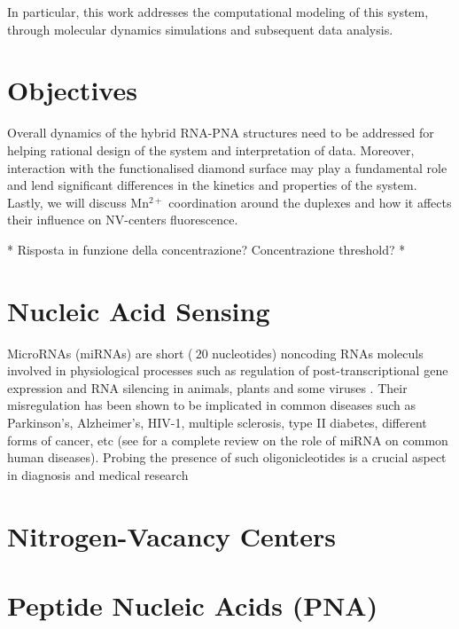 In particular, this work addresses the computational modeling of this system, through molecular dynamics simulations and subsequent data analysis.

\section{Objectives}

Overall dynamics of the hybrid RNA-PNA structures need to be addressed for helping rational design of the system and interpretation of data.
Moreover, interaction with the functionalised diamond surface may play a fundamental role and lend significant differences in the kinetics and properties of the system. Lastly, we will discuss Mn$^{2+}$ coordination around the duplexes and how it affects their influence on NV-centers fluorescence.

*
Risposta in funzione della concentrazione?
Concentrazione threshold?
*

\section{Nucleic Acid Sensing}

MicroRNAs (miRNAs) are short ($~ 20$ nucleotides) noncoding RNAs moleculs involved in physiological processes such as regulation of post-transcriptional gene expression and RNA silencing in animals, plants and some viruses \parencite{bartel_micrornas_2009}.
Their misregulation has been shown to be implicated in common diseases such as Parkinson's, Alzheimer's, HIV-1, multiple sclerosis, type II diabetes, different forms of cancer, etc (see \parencite{li_micrornas_2012} for a complete review on the role of miRNA on common human diseases).
Probing the presence of such oligonicleotides is a crucial aspect in diagnosis and medical research


\section{Nitrogen-Vacancy Centers}

\section{Peptide Nucleic Acids (PNA)}

